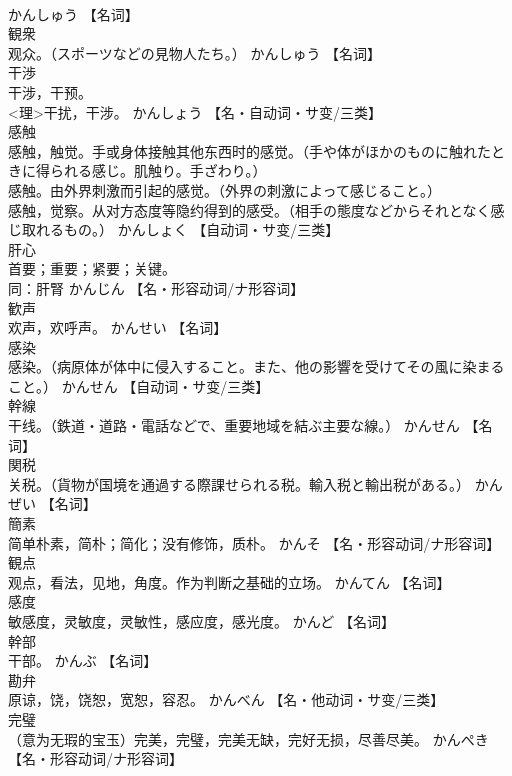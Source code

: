 \documentclass[8pt]{extreport}
\begin{document}
\begin{CJK}{UTF8}{min}
\\	かんしゅう		【名词】
\\	観衆	
\\	观众。（スポーツなどの見物人たち。）	かんしゅう		【名词】
\\	干渉	
\\	干涉，干预。 
\\	<理>干扰，干涉。	かんしょう		【名・自动词・サ变/三类】
\\	感触	
\\	感触，触觉。手或身体接触其他东西时的感觉。（手や体がほかのものに触れたときに得られる感じ。肌触り。手ざわり。） 
\\	感触。由外界刺激而引起的感觉。（外界の刺激によって感じること。） 
\\	感触，觉察。从对方态度等隐约得到的感受。（相手の態度などからそれとなく感じ取れるもの。）	かんしょく		【自动词・サ变/三类】
\\	肝心	
\\	首要；重要；紧要；关键。 
\\	同：肝腎	かんじん		【名・形容动词/ナ形容词】
\\	歓声	
\\	欢声，欢呼声。	かんせい		【名词】
\\	感染	
\\	感染。（病原体が体中に侵入すること。また、他の影響を受けてその風に染まること。）	かんせん		【自动词・サ变/三类】
\\	幹線	
\\	干线。（鉄道・道路・電話などで、重要地域を結ぶ主要な線。）	かんせん		【名词】
\\	関税	
\\	关税。（貨物が国境を通過する際課せられる税。輸入税と輸出税がある。）	かんぜい		【名词】
\\	簡素	
\\	简单朴素，简朴；简化；没有修饰，质朴。	かんそ		【名・形容动词/ナ形容词】
\\	観点	
\\	观点，看法，见地，角度。作为判断之基础的立场。	かんてん		【名词】
\\	感度	
\\	敏感度，灵敏度，灵敏性，感应度，感光度。	かんど		【名词】
\\	幹部	
\\	干部。	かんぶ		【名词】
\\	勘弁	
\\	原谅，饶，饶恕，宽恕，容忍。	かんべん		【名・他动词・サ变/三类】
\\	完璧	
\\	（意为无瑕的宝玉）完美，完璧，完美无缺，完好无损，尽善尽美。	かんぺき		【名・形容动词/ナ形容词】

\end{CJK}
\end{document}
